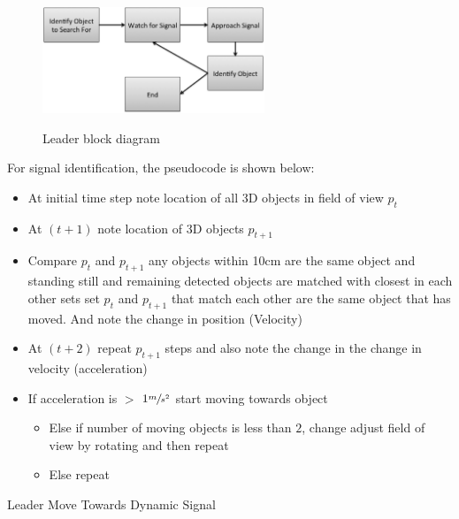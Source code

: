 \documentclass[conference]{IEEEtran}
\makeatletter
\renewcommand\subsection{\@startsection{subsection}{1}{\z@}
                                  {-2.0ex plus -1.5ex minus -0.5ex}
                                  {0.7ex plus 1ex minus 0ex}
                                  {\itshape\bfseries}}
\makeatother
\begin{document}
\begin{figure}[h]
	\centering
	\includegraphics[height=90pt]{images/Leader_Block.png} 
	\label{fig:Leader}
    \caption{Leader block diagram}
\end{figure}

For signal identification, the pseudocode is shown below:

\begin{itemize}
\item{At initial time step note location of all 3D objects in field of view $p_{t}$}
\item{At $(t+1)$ note location of 3D objects $p_{t+1}$}
\item{Compare $p_{t}$ and $p_{t+1}$ any objects within 10cm are the same object and standing still and remaining detected objects are matched with closest in each other sets set $p_{t}$  and $p_{t+1}$ that match each other are the same object that has moved.  And note the change in position (Velocity)}
\item{At $(t+2)$ repeat $p_{t+1}$ steps and also note the change in the change in velocity (acceleration)}
\item{If acceleration is $>$ $1 \sfrac{m}{s^{2}}$ start moving towards object
	\begin{itemize}
		\item{Else if number of moving objects is less than $2$, change adjust field of view by rotating and then repeat}
		\item{Else repeat} 
	\end{itemize} }
\end{itemize}

\subsection{Leader Move Towards Dynamic Signal}
\label{sec:LeaderMoveTowardsDynamicSignal}
\end{document}

